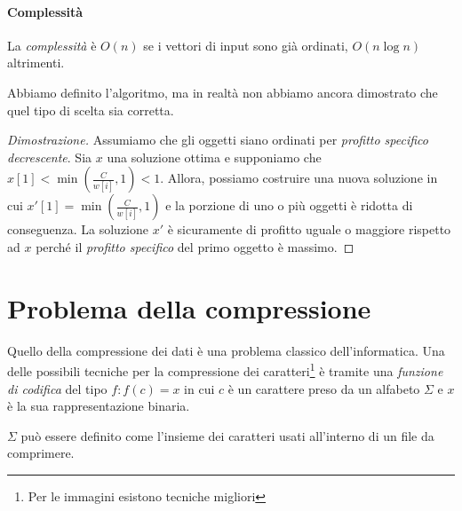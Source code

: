 \paragraph{Complessità}
La \emph{complessità} è $O(n)$ se i vettori di input sono già ordinati, $O(n\log
n)$ altrimenti.

\bigskip\noindent
Abbiamo definito l'algoritmo, ma in realtà non abbiamo ancora dimostrato che
quel tipo di scelta sia corretta.

\begin{proof}[Dimostrazione]
    Assumiamo che gli oggetti siano ordinati per \emph{profitto specifico
    decrescente}. Sia $x$ una soluzione ottima e supponiamo che $x[1]<\min\left(
    \frac{C}{w[i]}, 1\right)<1$. Allora, possiamo costruire una nuova soluzione
    in cui $x'[1]=\min\left(\frac{C}{w[i]}, 1\right)$ e la porzione di uno o
    più oggetti è ridotta di conseguenza. La soluzione $x'$ è sicuramente di
    profitto uguale o maggiore rispetto ad $x$ perché il \emph{profitto
    specifico} del primo oggetto è massimo.
\end{proof}

\section{Problema della compressione}
Quello della compressione dei dati è una problema classico dell'informatica.
Una delle possibili tecniche per la compressione dei caratteri\footnote{Per
le immagini esistono tecniche migliori} è tramite una \emph{funzione di codifica}
del tipo $f:f(c)=x$ in cui $c$ è un carattere preso da un alfabeto $\Sigma$ e
$x$ è la sua rappresentazione binaria.

\begin{note}
    $\Sigma$ può essere definito come l'insieme dei caratteri usati all'interno
    di un file da comprimere.
\end{note}

